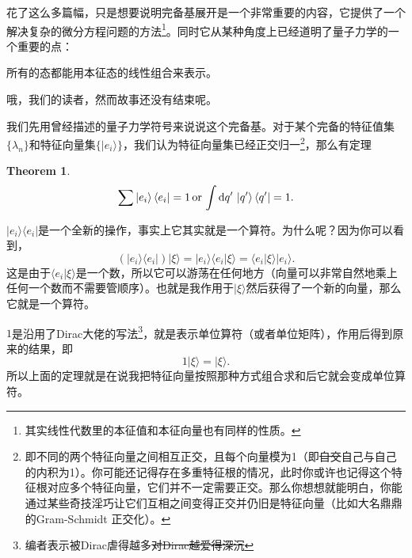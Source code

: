 \documentclass[12pt,a4paper,openany,twoside]{book}
\newtheorem{theorem}{Theorem}[section]
\numberwithin{equation}{section}
\newcommand{\ud}{\mathrm{d}}
\begin{document}
          花了这么多篇幅，只是想要说明完备基展开是一个非常重要的内容，它提供了一个解决复杂的微分方程问题的方法\footnote{其实线性代数里的本征值和本征向量也有同样的性质。}。同时它从某种角度上已经道明了量子力学的一个重要的点：
          \begin{center}
            所有的态都能用本征态的线性组合来表示。
          \end{center}

          哦，我们的读者，然而故事还没有结束呢。

          我们先用曾经描述的量子力学符号来说说这个完备基。对于某个完备的特征值集$\{\lambda_n\}$和特征向量集$\{| e_i \rangle \}$，我们认为特征向量集已经正交归一\footnote{即不同的两个特征向量之间相互正交，且每个向量模为1（即\sout{自交}自己与自己的内积为1）。你可能还记得存在多重特征根的情况，此时你或许也记得这个特征根对应多个特征向量，它们并不一定需要正交。那么你想想就能明白，你能通过某些奇技淫巧让它们互相之间变得正交并仍旧是特征向量（比如大名鼎鼎的Gram-Schmidt 正交化）。}，那么有定理
          \begin{theorem}
            \begin{equation}
              \sum \ket{e_i}\bra{e_i} = 1 \, \text{or} \, \int \ud q' \, \ket{q'}\bra{q'} = 1.
            \end{equation}
          \end{theorem}

          $| e_i \rangle \langle e_i | $是一个全新的操作，事实上它其实就是一个算符。为什么呢？因为你可以看到，
          \begin{equation}
            (| e_i \rangle \langle e_i | ) | \xi \rangle = | e_i \rangle \langle e_i | \xi \rangle = \langle e_i | \xi \rangle | e_i \rangle  .
            \label{ ket bra }
          \end{equation}
          这是由于$ \langle e_i | \xi \rangle $是一个数，所以它可以游荡在任何地方（向量可以非常自然地乘上任何一个数而不需要管顺序）。也就是我作用于$| \xi \rangle $然后获得了一个新的向量，那么它就是一个算符。

          $1$是沿用了Dirac大佬的写法\footnote{编者表示被Dirac虐得越多\sout{对Dirac越爱得深沉}}，就是表示单位算符（或者单位矩阵），作用后得到原来的结果，即
          \begin{equation}
            1 | \xi \rangle = | \xi \rangle .
          \end{equation}
          所以上面的定理就是在说我把特征向量按照那种方式组合求和后它就会变成单位算符。
\end{document}

